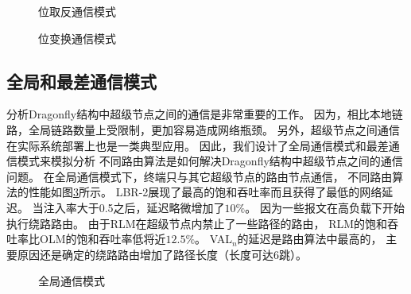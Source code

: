 \begin{figure}[htbp]
  \centering
  \begin{minipage}[t]{\textwidth}
    \centering
    \caption{位取反通信模式}
    \label{fig:bitrev}
  \end{minipage}
\end{figure}

\begin{figure}[htbp]
  \centering
  \begin{minipage}[t]{\textwidth}
    \centering
    \caption{位变换通信模式}
    \label{fig:transpose}
  \end{minipage}
\end{figure}

\subsection{全局和最差通信模式}

分析Dragonfly结构中超级节点之间的通信是非常重要的工作。
因为，相比本地链路，全局链路数量上受限制，更加容易造成网络瓶颈。
另外，超级节点之间通信在实际系统部署上也是一类典型应用。
因此，我们设计了全局通信模式和最差通信模式来模拟分析
不同路由算法是如何解决Dragonfly结构中超级节点之间的通信问题。
在全局通信模式下，终端只与其它超级节点的路由节点通信，
不同路由算法的性能如图\ref{fig:global}所示。
LBR-2展现了最高的饱和吞吐率而且获得了最低的网络延迟。
当注入率大于0.5之后，延迟略微增加了$10\%$。
因为一些报文在高负载下开始执行绕路路由。
由于RLM在超级节点内禁止了一些路径的路由，
RLM的饱和吞吐率比OLM的饱和吞吐率低将近$12.5\%$。
VAL$_n$的延迟是路由算法中最高的，
主要原因还是确定的绕路路由增加了路径长度（长度可达6跳）。

\begin{figure}[htbp]
  \centering
  \begin{minipage}[t]{\textwidth}
  \centering
  \caption{全局通信模式}
  \label{fig:global}
  \end{minipage}
\end{figure}

